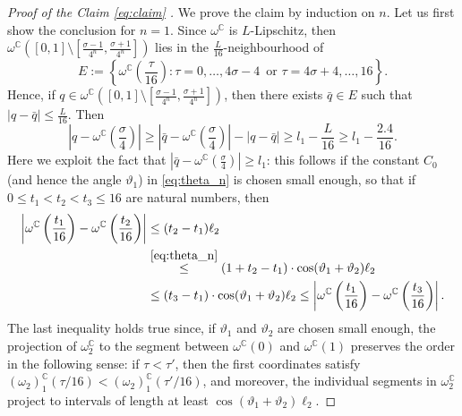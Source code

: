 \documentclass[12pt]{amsart}
\newcommand{\C}{\mathbb C}
\renewcommand{\theta}{\vartheta}
\numberwithin{equation}{section}
\theoremstyle{plain}
\theoremstyle{definition}
\theoremstyle{remark}
\begin{document}
\begin{proof}[Proof of the Claim \eqref{eq:claim} ]
   We prove the claim by induction on $n$. Let us first show the conclusion for $n=1$.  Since $\omega^\C$ is $L$-Lipschitz, then $\omega^\C\left([0,1]\setminus\left[\frac{\sigma-1}{4^n},\frac{\sigma +1}{4^n}\right]\right)$ lies in the $\frac{L}{16}$-neighbourhood of \[E:=\left\{\omega^\C\left(\frac{\tau}{16}\right): \tau=0,\dots,4\sigma-4\,\text{ or }\tau=4\sigma+4,\dots, 16\right\}.\]
   Hence, if $q\in \omega^\C\left([0,1]\setminus\left[\frac{\sigma-1}{4^n},\frac{\sigma +1}{4^n}\right]\right)$, then there exists $\bar q\in E$ such that $|q-\bar q|\leq \frac{L}{16}$. Then
   \begin{equation}\label{qnotinball}\left|q-\omega^\C\left(\frac{\sigma}{4}\right)\right|\geq\left|\bar q-\omega^\C\left(\frac{\sigma}{4}\right)\right|-\left|q-\bar q\right|\geq l_1- \frac{L}{16}\geq l_1-\frac{2.4}{16}.\end{equation}  Here we exploit the fact that $\left|\bar q-\omega^\C\left(\frac{\sigma}{4}\right)\right|\geq l_1$: this follows if the constant $C_0$ (and hence the angle $\theta_1$) in \eqref{eq:theta_n} is chosen small enough, so that if $0\leq t_1<t_2<t_3\leq 16$ are natural numbers, then
   \begin{align}\label{eq:Ordner}
   \left|\omega^\C\left(\frac{t_1}{16}\right)-\omega^\C\left(\frac{t_2}{16}\right)\right|
   &\leq
   (t_2-t_1)  \ell_2\\
&\overset{\eqref{eq:theta_n}}{\leq} \left(1 + t_2-t_1\right)\cdot \cos (\theta_1+\theta_2) \ell_2\notag\\
   &\leq (t_3-t_1) \cdot  \cos(\theta_1+\theta_2)\ell_2
   \leq \left|\omega^\C\left(\frac{t_1}{16}\right)-\omega^\C\left(\frac{t_3}{16}\right)\right|.\notag
   \end{align}
   The last inequality holds true since, if $\theta_1$ and $\theta_2$ are chosen small enough, the projection of $\omega^{\mathbb{C}}_2$ to the segment between $\omega^{\mathbb{C}}(0)$ and  $\omega^{\mathbb{C}}(1)$
   preserves the order in the following sense:
   if $\tau<\tau'$, then the first coordinates satisfy $(\omega_2)_1^{\mathbb{C}}(\tau/16)<(\omega_2)_1^{\mathbb{C}}(\tau'/16)$, and moreover, the individual segments in $\omega^{\mathbb{C}}_2$ project to intervals of length at least $ \cos(\theta_1+\theta_2)\ell_2$.
   
   
   

\end{proof}
\end{document}
